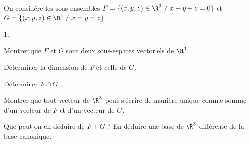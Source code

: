 \documentclass[11pt]{article}%
\begin{document}
\begin{exercice}~\\
On considère les sous-ensembles $F=\{(x,y,z) \in \R^3 \ / \ x+y+z=0\}$ 
et 
 $G=\{ (x,y,z) \in \R^3 \ / \ x=y=z\}$.
 \begin{noliste}{1.}
 \item Montrer que $F$ et $G$ sont deux sous-espaces vectoriels de 
$\R^3$.
 \item Déterminer la dimension de $F$ et celle de $G$.
 \item Déterminer $F \cap G$.
 \item Montrer que tout vecteur de $\R^3$ peut s'écrire de manière 
unique comme somme d'un vecteur de $F$ et d'un vecteur de $G$.
 \item Que peut-on en déduire de $F+G$ ? En déduire une base de $\R^3$ 
différente de la base canonique.
 \end{noliste}
\end{exercice}
\end{document}
